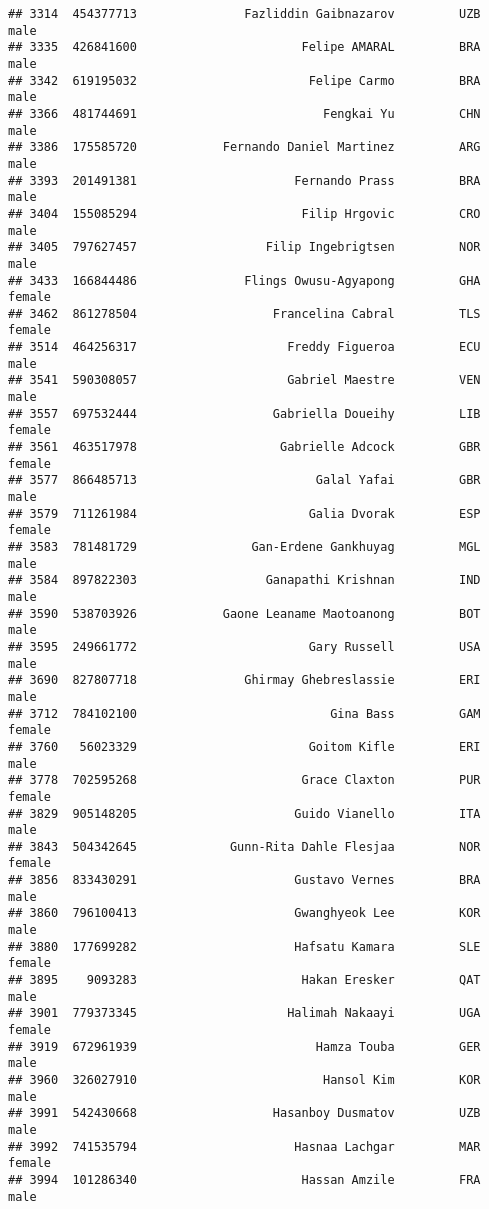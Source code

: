 \documentclass[]{article}
\begin{document}
\begin{verbatim}
## 3314  454377713               Fazliddin Gaibnazarov         UZB   male
## 3335  426841600                       Felipe AMARAL         BRA   male
## 3342  619195032                        Felipe Carmo         BRA   male
## 3366  481744691                          Fengkai Yu         CHN   male
## 3386  175585720            Fernando Daniel Martinez         ARG   male
## 3393  201491381                      Fernando Prass         BRA   male
## 3404  155085294                       Filip Hrgovic         CRO   male
## 3405  797627457                  Filip Ingebrigtsen         NOR   male
## 3433  166844486               Flings Owusu-Agyapong         GHA female
## 3462  861278504                   Francelina Cabral         TLS female
## 3514  464256317                     Freddy Figueroa         ECU   male
## 3541  590308057                     Gabriel Maestre         VEN   male
## 3557  697532444                   Gabriella Doueihy         LIB female
## 3561  463517978                    Gabrielle Adcock         GBR female
## 3577  866485713                         Galal Yafai         GBR   male
## 3579  711261984                        Galia Dvorak         ESP female
## 3583  781481729                Gan-Erdene Gankhuyag         MGL   male
## 3584  897822303                  Ganapathi Krishnan         IND   male
## 3590  538703926            Gaone Leaname Maotoanong         BOT   male
## 3595  249661772                        Gary Russell         USA   male
## 3690  827807718               Ghirmay Ghebreslassie         ERI   male
## 3712  784102100                           Gina Bass         GAM female
## 3760   56023329                        Goitom Kifle         ERI   male
## 3778  702595268                       Grace Claxton         PUR female
## 3829  905148205                      Guido Vianello         ITA   male
## 3843  504342645             Gunn-Rita Dahle Flesjaa         NOR female
## 3856  833430291                      Gustavo Vernes         BRA   male
## 3860  796100413                      Gwanghyeok Lee         KOR   male
## 3880  177699282                      Hafsatu Kamara         SLE female
## 3895    9093283                       Hakan Eresker         QAT   male
## 3901  779373345                     Halimah Nakaayi         UGA female
## 3919  672961939                         Hamza Touba         GER   male
## 3960  326027910                          Hansol Kim         KOR   male
## 3991  542430668                   Hasanboy Dusmatov         UZB   male
## 3992  741535794                      Hasnaa Lachgar         MAR female
## 3994  101286340                       Hassan Amzile         FRA   male

\end{verbatim}
\end{document}
